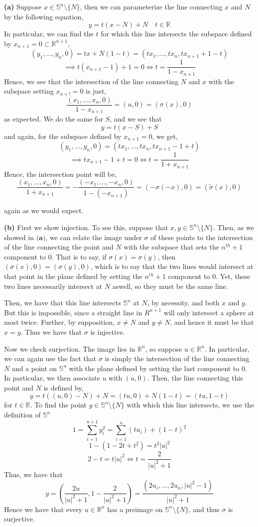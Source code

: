 \documentclass[10pt]{article}
\newcommand{\R}{\mathbb{R}}
\newcommand{\Sp}{\mathbb{S}}
\begin{document}
\textbf{(a)} Suppose $x\in \Sp^{n}\setminus \{N\}$, then we can parameterize the line connecting $x$ and $N$ by the following equation,
$$y = t(x-N)+ N \hspace{1em} t\in \R$$
In particular, we can find the $t$ for which this line intersects the subspace defined by $x_{n+1} = 0 \subset \R^{n+1}$,
$$(y_{1}, \dots, y_{n}, 0) = tx + N(1-t) = (tx_{1}, \dots, tx_{n}, tx_{n+1} + 1 - t)$$
$$ \implies t(x_{n+1} - 1) + 1 = 0 \iff t = \frac{1}{1-x_{n+1}}$$
Hence, we see that the intersection of the line connecting $N$ and $x$ with the subspace setting $x_{n+!} = 0$ is just,
$$\frac{(x_{1},\dots,x_{n},0)}{1-x_{n+1}} = (u,0) = (\sigma(x),0) $$
as expected. We do the same for $S$, and we see that
$$y = t(x-S) + S$$
and again, for the subspace defined by $x_{n+1}= 0$, we get,
$$ (y_{1}, \dots, y_{n}, 0) = (tx_{1},\dots,tx_{n},tx_{n+1} -1 +t)$$
$$ \implies tx_{n+1} -1 +t = 0 \iff t = \frac{1}{1 + x_{n+1}}$$
Hence, the intersection point will be,
$$\frac{(x_{1},\dots,x_{n},0)}{1+x_{n+1}} = -\frac{(-x_{1},\dots,-x_{n},0)}{1-(-x_{n+1})} = (-\sigma(-x),0) = (\tilde{\sigma}(x),0)$$

again as we would expect.

\textbf{(b)} First we show injection. To see this, suppose that $x,y \in \Sp^{n}\setminus \{N\}$. Then, as we showed in $\textbf{(a)}$, we can relate the image under $\sigma$ of these points to the intersection of the line connecting the point and $N$ with the subspace that sets the $n^{th}+1$ component to 0. That is to say, if $\sigma(x) = \sigma(y)$, then $(\sigma(x),0) = (\sigma(y),0)$, which is to say that the two lines would intersect at that point in the plane defined by setting the $n^{th}+1$ component to 0. Yet, these two lines necessarily intersect at $N$ aswell, so they must be the same line.

Then, we have that this line intersects $\Sp^{n}$ at $N$, by necessity, and both $x$ and $y$. But this is impossible, since a straight line in $R^{n+1}$ will only intersect a sphere at most twice. Further, by supposition, $x \neq N$ and $y \neq N$, and hence it must be that $x=y$. Thus we have that $\sigma$ is injective.

Now we check surjection. The image lies in $\R^{n}$, so suppose $u\in\R^{n}$. In particular, we can again use the fact that $\sigma$ is simply the intersection of the line connecting $N$ and a point on $\Sp^{n}$ with the plane defined by setting the last component to 0. In particular, we then associate $u$ with $(u,0)$. Then, the line connecting this point and $N$ is defined by,
$$y = t((u,0) - N) + N = (tu,0) + N(1-t) = (tu,1-t)$$
for $t\in\R$. To find the point $y\in \Sp^{n}\setminus \{N\}$ with which this line intersects, we use the definition of $\Sp^{n}$
$$1 = \sum_{i=1}^{n+1}y_{i}^{2} = \sum_{i=1}^{n}(tu_{i}) + (1-t)^{2}$$
$$1 - (1 -2t +t^{2}) = t^{2}|u|^{2}$$
$$2 - t = t|u|^{2} \iff t = \frac{2}{|u|^{2} +1}$$
Thus, we have that
$$y = \left(\frac{2u}{|u|^{2} + 1},1 - \frac{2}{|u|^{2} + 1}\right) = \frac{(2u_{i},\dots,2u_{n},|u|^{2}-1)}{|u|^{2} + 1}$$
Hence we have that every $u\in\R^{n}$ has a preimage on $\Sp^{n}\setminus \{N\}$, and thus $\sigma$ is surjective.
\end{document}
